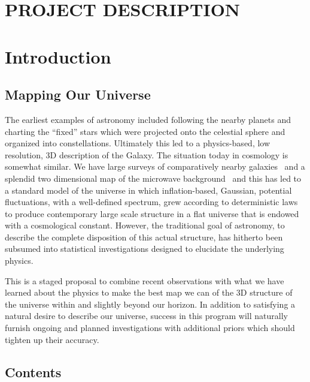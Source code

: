 \documentclass[psfig,11pt]{article}
\begin{document}
\section*{PROJECT DESCRIPTION}


\section{Introduction}

\subsection{Mapping Our Universe}

The earliest examples of astronomy included following the nearby planets and charting the ``fixed'' stars which were projected onto the celestial sphere and organized into constellations. Ultimately this led to a physics-based, low resolution,  3D description of the Galaxy. The situation today in cosmology is somewhat similar. We have large surveys of comparatively nearby galaxies~\cite{Alam2015, ???} and a splendid two dimensional map of the microwave background~\cite{Planck2015maps} and this has led to a standard model of the universe in which inflation-based, Gaussian, potential fluctuations, with a well-defined spectrum, grew according to deterministic laws to produce contemporary large scale structure in a flat universe that is endowed with a cosmological constant. However, the traditional goal of astronomy, to describe the complete disposition of this actual structure, has hitherto been subsumed into statistical investigations designed to elucidate the underlying physics.

This is a staged proposal to combine recent observations with what we have learned about the physics to make the best map we can of the 3D structure of the universe within and slightly beyond our horizon. In addition to satisfying a natural desire to describe our universe, success in this program will naturally furnish ongoing and planned investigations with additional priors which should tighten up their accuracy.

\subsection{Contents}
\end{document}
